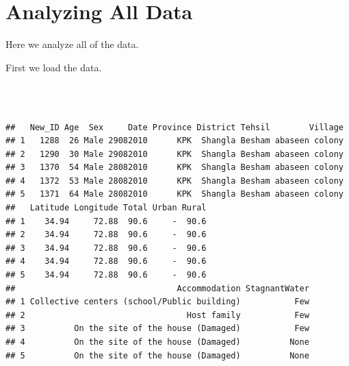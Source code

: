\section{Analyzing All Data}
\label{sec:overall}
Here we analyze all of the data.

First we load the data.
\begin{knitrout}
\color{fgcolor}\begin{kframe}
\begin{flushleft}
\ttfamily\noindent
{}\hlkeyword{(}\hlkeyword{)}\hspace*{\fill}\\
\hlstd{}\hlkeyword{(}\hlkeyword{)}\hspace*{\fill}\\
\hlstd{}\hlkeyword{(}\hlkeyword{,}{\ }\hlargument{=}{\ }\hlkeyword{)}\mbox{}
\normalfont
\end{flushleft}
\begin{verbatim}
##   New_ID Age  Sex     Date Province District Tehsil        Village
## 1   1288  26 Male 29082010      KPK  Shangla Besham abaseen colony
## 2   1290  30 Male 29082010      KPK  Shangla Besham abaseen colony
## 3   1370  54 Male 28082010      KPK  Shangla Besham abaseen colony
## 4   1372  53 Male 28082010      KPK  Shangla Besham abaseen colony
## 5   1371  64 Male 28082010      KPK  Shangla Besham abaseen colony
##   Latitude Longitude Total Urban Rural
## 1    34.94     72.88  90.6     -  90.6
## 2    34.94     72.88  90.6     -  90.6
## 3    34.94     72.88  90.6     -  90.6
## 4    34.94     72.88  90.6     -  90.6
## 5    34.94     72.88  90.6     -  90.6
##                                 Accommodation StagnantWater
## 1 Collective centers (school/Public building)           Few
## 2                                 Host family           Few
## 3          On the site of the house (Damaged)           Few
## 4          On the site of the house (Damaged)          None
## 5          On the site of the house (Damaged)          None
\end{verbatim}
\end{kframe}
\end{knitrout}



